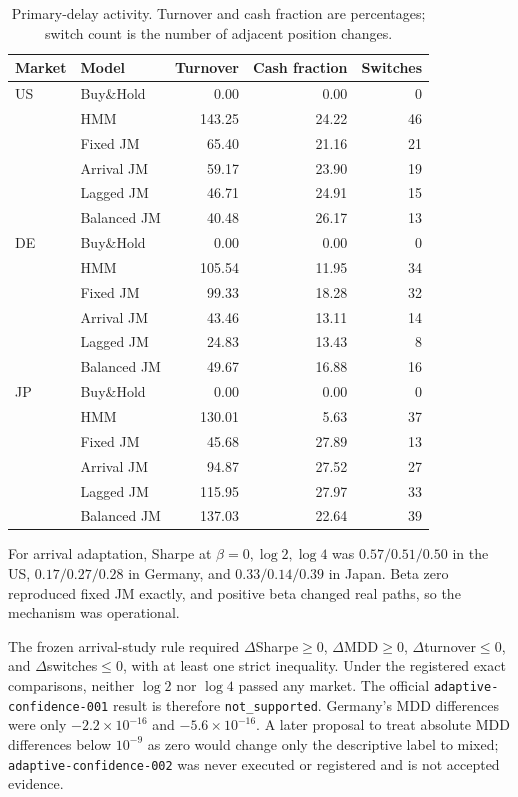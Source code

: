 \documentclass[11pt]{article}
\newcommand{\BH}{Buy\&Hold}
\begin{document}
\begin{table}[!htbp]
\centering
\caption{Primary-delay activity. Turnover and cash fraction are percentages;
switch count is the number of adjacent position changes.}
\label{tab:adaptive-activity}
\small
\begin{tabular}{llrrr}
\toprule
Market & Model & Turnover & Cash fraction & Switches \\
\midrule
US & \BH{}      & 0.00 & 0.00 & 0 \\
   & HMM         & 143.25 & 24.22 & 46 \\
   & Fixed JM    & 65.40 & 21.16 & 21 \\
   & Arrival JM  & 59.17 & 23.90 & 19 \\
   & Lagged JM   & 46.71 & 24.91 & 15 \\
   & Balanced JM & 40.48 & 26.17 & 13 \\
\addlinespace
DE & \BH{}      & 0.00 & 0.00 & 0 \\
   & HMM         & 105.54 & 11.95 & 34 \\
   & Fixed JM    & 99.33 & 18.28 & 32 \\
   & Arrival JM  & 43.46 & 13.11 & 14 \\
   & Lagged JM   & 24.83 & 13.43 & 8 \\
   & Balanced JM & 49.67 & 16.88 & 16 \\
\addlinespace
JP & \BH{}      & 0.00 & 0.00 & 0 \\
   & HMM         & 130.01 & 5.63 & 37 \\
   & Fixed JM    & 45.68 & 27.89 & 13 \\
   & Arrival JM  & 94.87 & 27.52 & 27 \\
   & Lagged JM   & 115.95 & 27.97 & 33 \\
   & Balanced JM & 137.03 & 22.64 & 39 \\
\bottomrule
\end{tabular}
\end{table}

For arrival adaptation, Sharpe at \(\beta=0,\log2,\log4\) was
\(0.57/0.51/0.50\) in the US,
\(0.17/0.27/0.28\) in Germany, and
\(0.33/0.14/0.39\) in Japan. Beta zero reproduced fixed JM exactly,
and positive beta changed real paths, so the mechanism was operational.

The frozen arrival-study rule required
\(\Delta\)Sharpe\(\ge0\), \(\Delta\)MDD\(\ge0\),
\(\Delta\)turnover\(\le0\), and \(\Delta\)switches\(\le0\), with at least one
strict inequality. Under the registered exact comparisons, neither \(\log2\)
nor \(\log4\) passed any market. The official
\texttt{adaptive-confidence-001} result is therefore
\texttt{not\_supported}.
Germany's MDD differences were only
\(-2.2\times10^{-16}\) and \(-5.6\times10^{-16}\). A later proposal to treat
absolute MDD differences below \(10^{-9}\) as zero would change only the
descriptive label to mixed; \texttt{adaptive-confidence-002} was never executed
or registered and is not accepted evidence.
\end{document}
